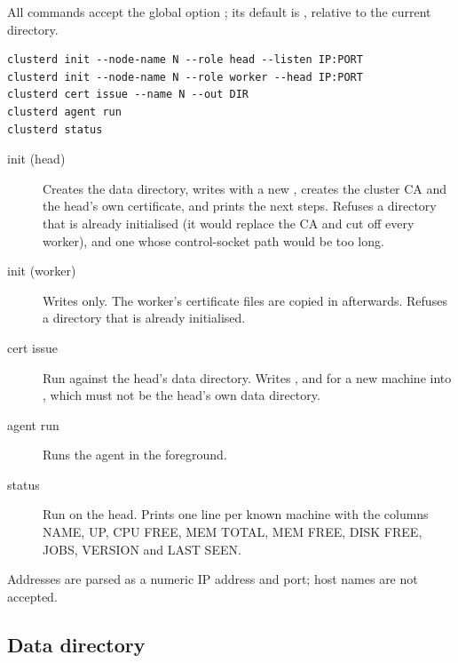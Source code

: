 \documentclass{article}
\begin{document}
All commands accept the global option ; its default is
, relative to the current directory.

\begin{verbatim}
clusterd init --node-name N --role head --listen IP:PORT
clusterd init --node-name N --role worker --head IP:PORT
clusterd cert issue --name N --out DIR
clusterd agent run
clusterd status
\end{verbatim}

\begin{description}
  \item[init (head)]
    Creates the data directory, writes  with a new
    , creates the cluster CA and the head's own certificate,
    and prints the next steps. Refuses a directory that is already
    initialised (it would replace the CA and cut off every worker), and
    one whose control-socket path would be too long.
  \item[init (worker)]
    Writes  only. The worker's certificate files are
    copied in afterwards. Refuses a directory that is already
    initialised.
  \item[cert issue]
    Run against the head's data directory. Writes ,
     and  for a new machine into
    , which must not be the head's own data directory.
  \item[agent run]
    Runs the agent in the foreground.
  \item[status]
    Run on the head. Prints one line per known machine with the columns
    NAME, UP, CPU FREE, MEM TOTAL, MEM FREE, DISK FREE, JOBS, VERSION and
    LAST SEEN.
\end{description}

Addresses are parsed as a numeric IP address and port; host names are not
accepted.

\subsection{Data directory}
\end{document}
